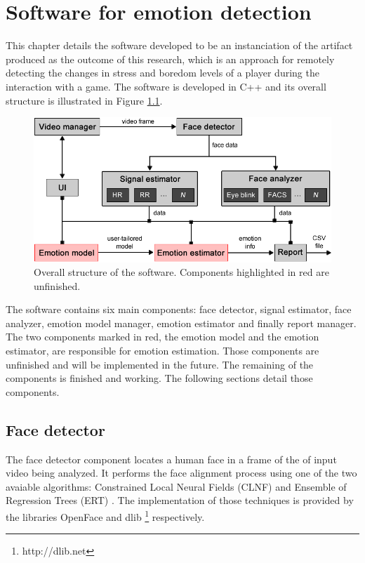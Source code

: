 \chapter{Software for emotion detection}
\label{ch:software}

This chapter details the software developed to be an instanciation of the artifact produced as the outcome of this research, which is an approach for remotely detecting the changes in stress and boredom levels of a player during the interaction with a game. The software is developed in C++ and its overall structure is illustrated in Figure \ref{fig:tool-overall-structure}.

\begin{figure}[h]
    \centering
    \includegraphics[width=\textwidth]{figures/tool-overall-structure.png}
    \caption{Overall structure of the software. Components highlighted in red are unfinished.}
    \label{fig:tool-overall-structure}
\end{figure}

The software contains six main components: face detector, signal estimator, face analyzer, emotion model manager, emotion estimator and finally report manager. The two components marked in red, the emotion model and the emotion estimator, are responsible for emotion estimation. Those components are unfinished and will be implemented in the future. The remaining of the components is finished and working. The following sections detail those components.

\section{Face detector}

The face detector component locates a human face in a frame of the of input video being analyzed. It performs the face alignment process using one of the two avaiable algorithms: Constrained Local Neural Fields (CLNF) \parencite{baltrusaitis2013constrained} and Ensemble of Regression Trees (ERT) \parencite{kazemi2014one}. The implementation of those techniques is provided by the libraries OpenFace \parencite{baltruvsaitis2016openface} and dlib \footnote{http://dlib.​net} respectively.

